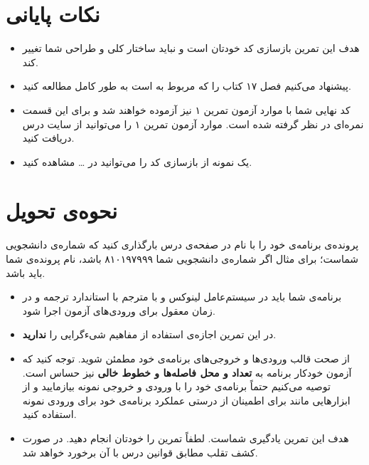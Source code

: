 \documentclass{utap}
\begin{document}
\section{نکات پایانی}
	  \begin{itemize}
	        \item
هدف این تمرین بازسازی کد خودتان است و نباید ساختار کلی و طراحی شما تغییر کند.
		\item
پیشنهاد می‌کنیم فصل ۱۷ کتاب  را که مربوط به  است به طور کامل مطالعه کنید.
		\item
کد نهایی شما با موارد آزمون تمرین ۱ نیز آزموده خواهند شد و برای این قسمت نمره‌ای در نظر گرفته شده است.
موارد آزمون تمرین ۱ را می‌توانید از سایت درس دریافت کنید.
		\item
یک نمونه از بازسازی کد را می‌توانید در \dots{} مشاهده کنید.  %

	  \end{itemize}

\section{نحوه‌ی تحویل}
    پرونده‌ی برنامه‌ی خود را با نام  در صفحه‌ی  درس بارگذاری کنید که  شماره‌ی دانشجویی شماست؛ برای مثال اگر شماره‌ی دانشجویی شما ۸۱۰۱۹۷۹۹۹ باشد، نام پرونده‌ی شما باید  باشد.
    \begin{itemize}
        \item
برنامه‌ی شما باید در سیستم‌عامل لینوکس و با مترجم  با استاندارد  ترجمه و در زمان معقول برای ورودی‌های آزمون اجرا شود.
        \item
در این تمرین اجازه‌ی استفاده از مفاهیم شیءگرایی را \textbf{ندارید}.
        \item
از صحت قالب ورودی‌ها و خروجی‌های برنامه‌ی خود مطمئن شوید. توجه کنید که آزمون خودکار برنامه به \textbf{تعداد و محل فاصله‌ها و خطوط خالی} نیز حساس است. توصیه می‌کنیم حتماً برنامه‌ی خود را با ورودی و خروجی نمونه بیازمایید و از ابزارهایی مانند  برای اطمینان از درستی عملکرد برنامه‌ی خود برای ورودی نمونه استفاده کنید.
        \item
هدف این تمرین یادگیری شماست. لطفاً تمرین را خودتان انجام دهید. در صورت کشف تقلب مطابق قوانین درس با آن برخورد خواهد شد.
    \end{itemize}
\end{document}

